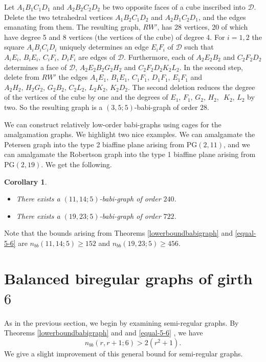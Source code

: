 \documentclass[a4paper,11pt]{article}
\newtheorem{corollary}[theorem]{Corollary}
\begin{document}
Let $A_1B_1C_1D_1$ and $A_2B_2C_2D_2$ be two opposite faces of a cube inscribed into $\mathcal{D}$. Delete the two tetrahedral vertices
$A_1B_2C_1D_2$ and $A_2B_1C_2D_1$, and the edges emanating from them. The resulting graph, $RW'$, 
has 28 vertices, 20 of which have degree 5 and 8 vertices (the vertices of the cube) of degree 4. For $i=1,2$ the square $A_iB_iC_iD_i$ uniquely determines an edge $E_iF_i$ of $\mathcal{D}$ such that $A_iE_i,\, B_iE_i,\, C_iF_i,\, D_iF_i$ are edges of $\mathcal{D}$.
Furthermore, each of $A_2E_2B_2$ and $C_2F_2D_2$ determines a face of $\mathcal{D}$, $A_2E_2B_2G_2H_2$ and  $C_2F_2D_2K_2L_2$. In the second step, delete from $RW'$ the edges $A_1E_1,\, B_1E_1,\, C_1F_1,\, D_1F_1,\, E_1F_1$ and $A_2H_2,\, H_2G_2,\, G_2B_2,\, 
C_2L_2,\, L_2K_2,\, K_2D_2$. The second deletion reduces the degree of the vertices of the cube by one and the degrees of $E_1,\, F_1,\, G_2,\, H_2,$
$\, K_2, \, L_2$ by two. So the resulting graph is a $(3,5;5)$-babi-graph of order $28.$



\smallskip
We can construct relatively low-order babi-graphs using cages for the amalgamation graphs. We highlight two nice examples. We can amalgamate the Petersen graph into the type 2 biaffine plane arising from 
$\mathrm{PG}(2,11)$, and we can amalgamate the Robertson graph 
into the type 1 biaffine plane arising from $\mathrm{PG}(2,19)$.  We get the following.

 \begin{corollary}
$ $ \begin{itemize}
\item
There exists a $(11,14;5)$-babi-graph of order $240$.
\item
There exists a $(19,23;5)$-babi-graph of order $722$.
\end{itemize}
\end{corollary}

Note that the bounds arising from Theorems \ref{lowerboundbabigraph} and \ref{equal-5-6}
are $n_{bb}(11,14;5)\geq 152$ and $n_{bb}(19,23;5)\geq 456$.  


\section{Balanced biregular graphs of girth $6$}\label{girth6}

As in the previous section, we begin by examining semi-regular graphs.
By Theorems \ref{lowerboundbabigraph} and and \ref{equal-5-6} , we have 
$$n_{bb}(r,r+1;6) > 2(r^2+1).$$
We give a slight improvement of this general bound for semi-regular graphs.
\end{document}
